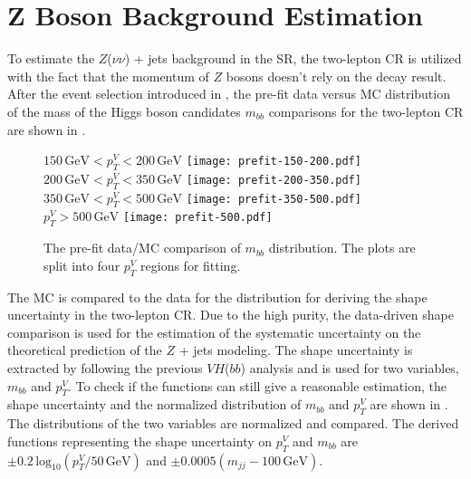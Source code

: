 \documentclass[class=NTHU_thesis, crop=false]{standalone}
\begin{document}
\chapter{Z Boson Background Estimation}
\label{chap:Z_bkg_estimation}
To estimate the $Z$($\nu\nu$) + jets background in the SR, the two-lepton CR is utilized with the fact that the momentum of $Z$ bosons doesn't rely on the decay result. After the event selection introduced in , the pre-fit data versus MC distribution of the mass of the Higgs boson candidates $m_{bb}$ comparisons for the two-lepton CR are shown in .

\begin{figure}[!hbt]
	\captionsetup[subfigure]{labelformat=empty}
	\centering
	\subcaptionbox
		{$150\, \mathrm{GeV} < p^V_T < 200\, \mathrm{GeV}$
		\label{fig:2-lep-prefit-fig1}}
		{\texttt{[image: prefit-150-200.pdf]}}
	\subcaptionbox
		{$200\, \mathrm{GeV} < p^V_T < 350\, \mathrm{GeV}$
		\label{fig:2-lep-prefit-fig2}}
		{\texttt{[image: prefit-200-350.pdf]}}
	\vspace{\baselineskip}
	\subcaptionbox
		{$350\, \mathrm{GeV} < p^V_T < 500\, \mathrm{GeV}$
		\label{fig:2-lep-prefit-fig3}}
		{\texttt{[image: prefit-350-500.pdf]}}
	\subcaptionbox
		{$p^V_T > 500\, \mathrm{GeV}$
		\label{fig:2-lep-prefit-fig4}}
		{\texttt{[image: prefit-500.pdf]}}
	\caption{The pre-fit data/MC comparison of $m_{bb}$ distribution. The plots are split into four $p^V_T$ regions for fitting.}
	\label{fig:2-lep-prefit}
\end{figure}

The MC is compared to the data for the distribution for deriving the shape uncertainty in the two-lepton CR. Due to the high purity, the data-driven shape comparison is used for the estimation of the systematic uncertainty on the theoretical prediction of the $Z$ + jets modeling. The shape uncertainty is extracted by following the previous $VH$($bb$) analysis \cite{PhysRevLett.119.181804} and is used for two variables, $m_{bb}$ and $p^V_T$. To check if the functions can still give a reasonable estimation, the shape uncertainty and the normalized distribution of $m_{bb}$ and $p^V_T$ are shown in . The distributions of the two variables are normalized and compared. The derived functions representing the shape uncertainty on $p^V_T$ and $m_{bb}$ are $\pm 0.2\, \mathrm{log}_{10} (p^V_T/50\, \mathrm{GeV})$ and $\pm 0.0005 (m_{jj} - 100\, \mathrm{GeV})$.
\end{document}

